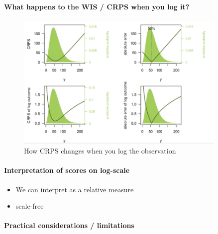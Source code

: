 \documentclass{article}
\begin{document}

\paragraph{What happens to the WIS / CRPS when you log it?}
\begin{figure}[h!]
    \centering
    \includegraphics[width=0.9\textwidth]{output/crps log viz.png}
    \caption{How CRPS changes when you log the observation}
    \label{fig:log-crps-viz}
\end{figure}



\paragraph{Interpretation of scores on log-scale}

\begin{itemize}
    \item We can interpret as a relative measure
    \item scale-free
\end{itemize}

\paragraph{Practical considerations / limitations}
\end{document}
